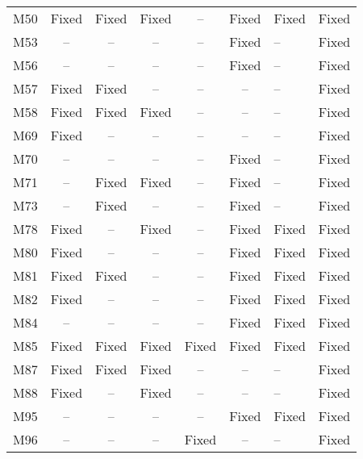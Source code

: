 \begin{table}[!t]
{\begin{tabular}{|c|c|c|c|c|c|}
M50               & Fixed     & Fixed     & Fixed     & --        & Fixed     & Fixed     &Fixed   \\
M53               & --        & --        & --        & --        & Fixed     & --        &Fixed   \\
M56               & --        & --        & --        & --        & Fixed     & --        &Fixed   \\
M57               & Fixed     & Fixed     & --        & --        & --        & --        &Fixed   \\
M58               & Fixed     & Fixed     & Fixed     & --        & --        & --        &Fixed   \\
M69               & Fixed     & --        & --        & --        & --        & --        &Fixed   \\
M70               & --        & --        & --        & --        & Fixed     & --        &Fixed   \\
M71               & --        & Fixed     & Fixed     & --        & Fixed     & --        &Fixed   \\
M73               & --        & Fixed     & --        & --        & Fixed     & --        &Fixed   \\
M78               & Fixed     & --        & Fixed     & --        & Fixed     & Fixed     &Fixed   \\
M80               & Fixed     & --        & --        & --        & Fixed     & Fixed     &Fixed   \\
M81               & Fixed     & Fixed     & --        & --        & Fixed     & Fixed     &Fixed   \\
M82               & Fixed     & --        & --        & --        & Fixed     & Fixed     &Fixed   \\
M84               & --        & --        & --        & --        & Fixed     & Fixed     &Fixed   \\
M85               & Fixed     & Fixed     & Fixed     & Fixed     & Fixed     & Fixed     &Fixed   \\
M87               & Fixed     & Fixed     & Fixed     & --        & --        & --        &Fixed   \\
M88               & Fixed     & --        & Fixed     & --        & --        & --        &Fixed   \\
M95               & --        & --        & --        & --        & Fixed     & Fixed     &Fixed   \\
M96               & --        & --        & --        & Fixed     & --        & --        &Fixed   \\

\end{tabular}}
\end{table}
